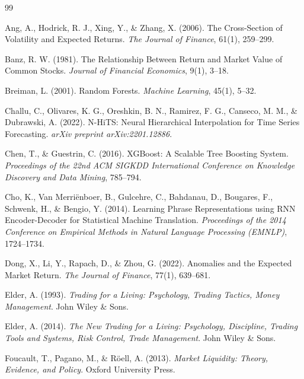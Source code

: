 \documentclass[11pt,a4paper]{article}
\begin{document}
\begin{thebibliography}{99}

Ang, A., Hodrick, R. J., Xing, Y., \& Zhang, X. (2006).
\newblock The Cross-Section of Volatility and Expected Returns.
\newblock \textit{The Journal of Finance}, 61(1), 259--299.

Banz, R. W. (1981).
\newblock The Relationship Between Return and Market Value of Common Stocks.
\newblock \textit{Journal of Financial Economics}, 9(1), 3--18.

Breiman, L. (2001).
\newblock Random Forests.
\newblock \textit{Machine Learning}, 45(1), 5--32.

Challu, C., Olivares, K. G., Oreshkin, B. N., Ramirez, F. G., Canseco, M. M., \& Dubrawski, A. (2022).
\newblock N-HiTS: Neural Hierarchical Interpolation for Time Series Forecasting.
\newblock \textit{arXiv preprint arXiv:2201.12886}.

Chen, T., \& Guestrin, C. (2016).
\newblock XGBoost: A Scalable Tree Boosting System.
\newblock \textit{Proceedings of the 22nd ACM SIGKDD International Conference on Knowledge Discovery and Data Mining}, 785--794.

Cho, K., Van Merriënboer, B., Gulcehre, C., Bahdanau, D., Bougares, F., Schwenk, H., \& Bengio, Y. (2014).
\newblock Learning Phrase Representations using RNN Encoder-Decoder for Statistical Machine Translation.
\newblock \textit{Proceedings of the 2014 Conference on Empirical Methods in Natural Language Processing (EMNLP)}, 1724--1734.

Dong, X., Li, Y., Rapach, D., \& Zhou, G. (2022).
\newblock Anomalies and the Expected Market Return.
\newblock \textit{The Journal of Finance}, 77(1), 639--681.

Elder, A. (1993).
\newblock \textit{Trading for a Living: Psychology, Trading Tactics, Money Management}.
\newblock John Wiley \& Sons.

Elder, A. (2014).
\newblock \textit{The New Trading for a Living: Psychology, Discipline, Trading Tools and Systems, Risk Control, Trade Management}.
\newblock John Wiley \& Sons.

Foucault, T., Pagano, M., \& Röell, A. (2013).
\newblock \textit{Market Liquidity: Theory, Evidence, and Policy}.
\newblock Oxford University Press.


\end{thebibliography}
\end{document}
